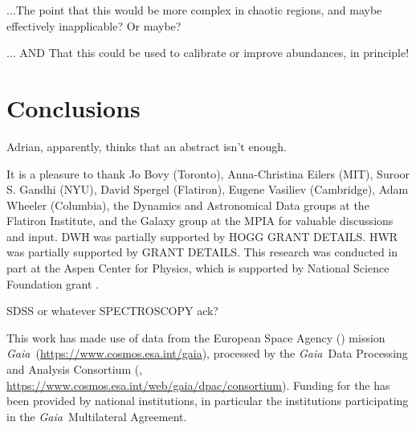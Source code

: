 \documentclass[modern]{aastex63}
\newcommand{\gaia}{\textsl{Gaia}}
\newcommand{\apogee}{\acronym{APOGEE}}
\newcommand{\sdss}{\acronym{SDSS}}
\begin{document}
...The point that this would be more complex in chaotic regions, and
maybe effectively inapplicable? Or maybe?

... AND That this could be used to calibrate or improve abundances, in
principle!

\section{Conclusions}
\label{sec:conclusions}

Adrian, apparently, thinks that an abstract isn't enough.


\acknowledgments
It is a pleasure to thank
  Jo Bovy (Toronto),
  Anna-Christina Eilers (MIT),
  Suroor S. Gandhi (NYU),
  David Spergel (Flatiron),
  Eugene Vasiliev (Cambridge),
  Adam Wheeler (Columbia),
  the Dynamics and Astronomical Data groups at the Flatiron Institute,
  and the Galaxy group at the MPIA
for valuable discussions and input.
DWH was partially supported by HOGG GRANT DETAILS.
HWR was partially supported by GRANT DETAILS.
This research was conducted in part at the Aspen Center for Physics,
which is supported by National Science Foundation grant .

SDSS or whatever SPECTROSCOPY ack?

This work has made use of data from the European Space Agency ()
mission \gaia\ (\url{https://www.cosmos.esa.int/gaia}), processed by the \gaia\
Data Processing and Analysis Consortium (,
\url{https://www.cosmos.esa.int/web/gaia/dpac/consortium}). Funding for the
\acronym{DPAC}
has been provided by national institutions, in particular the institutions
participating in the \gaia\ Multilateral Agreement.





\end{document}
